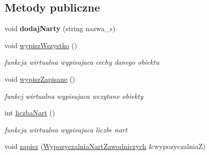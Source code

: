 \subsection*{Metody publiczne}
\begin{DoxyCompactItemize}
\item 
\mbox{\label{class_wypozyczalnia_nart_zawodniczych_a9c339169c48d6e6ef8310494cbfcf8de}} 
void {\bfseries dodaj\+Narty} (string nazwa\+\_\+s)
\item 
\mbox{\label{class_wypozyczalnia_nart_zawodniczych_a2bc434fdfbb3b3e48d063f7ca56c76be}} 
void \hyperlink{class_wypozyczalnia_nart_zawodniczych_a2bc434fdfbb3b3e48d063f7ca56c76be}{wypisz\+Wszystko} ()
\begin{DoxyCompactList}\small\item\em funkcja wirtualna wypisujaca cechy danego obiektu \end{DoxyCompactList}\item 
\mbox{\label{class_wypozyczalnia_nart_zawodniczych_a074ccb9dbe9b8be619053d0ed69edf26}} 
void \hyperlink{class_wypozyczalnia_nart_zawodniczych_a074ccb9dbe9b8be619053d0ed69edf26}{wypisz\+Zapisane} ()
\begin{DoxyCompactList}\small\item\em funkcj wirtualna wypisujaca wczytane obiekty \end{DoxyCompactList}\item 
\mbox{\label{class_wypozyczalnia_nart_zawodniczych_adc1ebefbce7393486ccd50ba3274b804}} 
int \hyperlink{class_wypozyczalnia_nart_zawodniczych_adc1ebefbce7393486ccd50ba3274b804}{liczba\+Nart} ()
\begin{DoxyCompactList}\small\item\em funkcja wirtualna wypisujaca liczbe nart \end{DoxyCompactList}\item 
\mbox{\label{class_wypozyczalnia_nart_zawodniczych_a84b33d3eb8f2c2889866207afa4f74e3}} 
void \hyperlink{class_wypozyczalnia_nart_zawodniczych_a84b33d3eb8f2c2889866207afa4f74e3}{zapisz} (\hyperlink{class_wypozyczalnia_nart_zawodniczych}{Wypozyczalnia\+Nart\+Zawodniczych} \&wypozyczalniaZ)

\end{DoxyCompactItemize}
